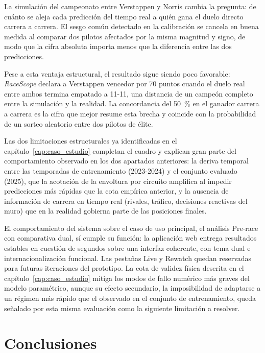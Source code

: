 La simulación del campeonato entre Verstappen y Norris cambia la pregunta: de cuánto se aleja cada predicción del tiempo real a quién gana el duelo directo carrera a carrera. El sesgo común detectado en la calibración se cancela en buena medida al comparar dos pilotos afectados por la misma magnitud y signo, de modo que la cifra absoluta importa menos que la diferencia entre las dos predicciones. 

Pese a esta ventaja estructural, el resultado sigue siendo poco favorable: \textit{RaceScope} declara a Verstappen vencedor por 70 puntos cuando el duelo real entre ambos termina empatado a 11-11, una distancia de un campeón completo entre la simulación y la realidad. La concordancia del 50~\% en el ganador carrera a carrera es la cifra que mejor resume esta brecha y coincide con la probabilidad de un sorteo aleatorio entre dos pilotos de élite.

Las dos limitaciones estructurales ya identificadas en el capítulo~\ref{cap:caso_estudio} completan el cuadro y explican gran parte del comportamiento observado en los dos apartados anteriores: la deriva temporal entre las temporadas de entrenamiento (2023-2024) y el conjunto evaluado (2025), que la acotación de la envoltura por circuito amplifica al impedir predicciones más rápidas que la cota empírica anterior, y la ausencia de información de carrera en tiempo real (rivales, tráfico, decisiones reactivas del muro) que en la realidad gobierna parte de las posiciones finales.

El comportamiento del sistema sobre el caso de uso principal, el análisis Pre-race con comparativa dual, sí cumple su función: la aplicación web entrega resultados estables en cuestión de segundos sobre una interfaz coherente, con tema dual e internacionalización funcional. Las pestañas Live y Rewatch quedan reservadas para futuras iteraciones del prototipo. La cota de validez física descrita en el capítulo~\ref{cap:caso_estudio} mitiga los modos de fallo numérico más graves del modelo paramétrico, aunque su efecto secundario, la imposibilidad de adaptarse a un régimen más rápido que el observado en el conjunto de entrenamiento, queda señalado por esta misma evaluación como la siguiente limitación a resolver.

\section{Conclusiones}
\label{sec:conclusiones}

